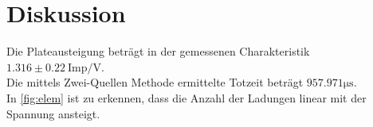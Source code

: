 \section{Diskussion}
\label{sec:discuss}

Die Plateausteigung beträgt in der gemessenen Charakteristik $1.316\pm0.22\ \text{Imp/V}$.\\
Die mittels Zwei-Quellen Methode ermittelte Totzeit beträgt $957.971\si{\micro\second}$.\\
In \autoref{fig:elem} ist zu erkennen, dass die Anzahl der Ladungen linear mit der Spannung ansteigt.